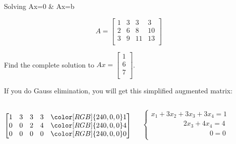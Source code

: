 \documentclass{beamer}
\begin{document}
\begin{frame}{Solving Ax=0 \& Ax=b}
\begin{example}
\begin{equation*}
    A=\left[ \begin{matrix}
        1&		3&		3&		3\\
        2&		6&		8&		10\\
        3&		9&		11&		13\\
    \end{matrix} \right]
\end{equation*}

Find the complete solution to $Ax=\left[ \begin{array}{c}
	1\\
	6\\
	7\\
\end{array} \right]$.
\end{example}

If you do Gauss elimination, you will get this simplified augmented matrix:
\begin{columns}
\begin{equation*}
    \left[ \begin{matrix}
        1&		3&		3&		3&		{\color[RGB]{240, 0, 0} 1}\\
        0&		0&		2&		4&		{\color[RGB]{240, 0, 0} 4}\\
        0&		0&		0&		0&		{\color[RGB]{240, 0, 0} 0}\\
    \end{matrix} \right]
\end{equation*}

\vspace{-8pt}
\begin{equation*}
    \begin{cases}
        x_1+3x_2+3x_3+3x_4=1\\
        \qquad\qquad\ \:\:2x_3+4x_4=4\\
        \qquad\qquad\qquad\qquad\:\:0=0\\
    \end{cases}
\end{equation*}
\end{columns}
\end{frame}
\end{document}
